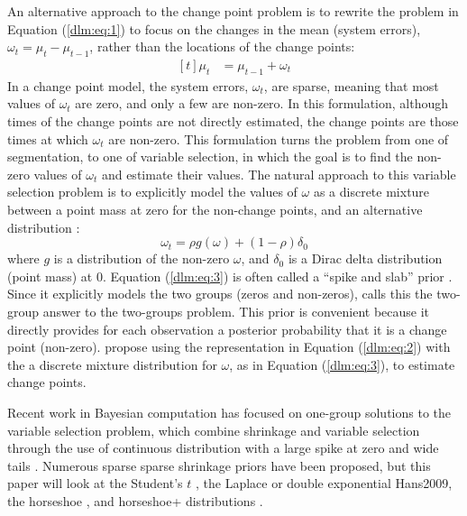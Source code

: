 An alternative approach to the change point problem is to rewrite the problem in Equation (\ref{dlm:eq:1}) to focus on the changes in the mean (system errors), $\omega_{t} = \mu_{t} - \mu_{t - 1}$, rather than the locations of the change points:
\begin{equation}
  \label{dlm:eq:2}
  \begin{aligned}[t]
    \mu_{t} &= \mu_{t - 1} + \omega_{t}
  \end{aligned}
\end{equation}
In a change point model, the system errors, $\omega_{t}$, are sparse, meaning that most values of $\omega_{t}$ are zero, and only a few are non-zero.
In this formulation, although times of the change points are not directly estimated, the change points are those times at which $\omega_{t}$ are non-zero.
This formulation turns the problem from one of segmentation, to one of variable selection, in which the goal is to find the non-zero values of $\omega_{t}$ and estimate their values.%
The natural approach to this variable selection problem is to explicitly model the values of $\omega$ as a discrete mixture between a point mass at zero for the non-change points, and an alternative distribution \parencites{MitchellBeauchamp1988a}{Efron2008a}:
\begin{equation}
  \label{dlm:eq:3}
  \omega_{t} = \rho g(\omega) + (1 - \rho) \delta_{0}
\end{equation}
where $g$ is a distribution of the non-zero $\omega$, and $\delta_{0}$ is a Dirac delta distribution (point mass) at 0.
Equation (\ref{dlm:eq:3}) is often called a ``spike and slab'' prior \parencite{MitchellBeauchamp1988a}.
Since it explicitly models the two groups (zeros and non-zeros), \textcite{Efron2008a} calls this the two-group answer to the two-groups problem.
This prior is convenient because it directly provides for each observation a posterior probability that it is a change point (non-zero).
\textcite{GiordaniKohn2008} propose using the representation in Equation (\ref{dlm:eq:2}) with the a discrete mixture distribution for $\omega$, as in Equation (\ref{dlm:eq:3}), to estimate change points.

Recent work in Bayesian computation has focused on one-group solutions to the variable selection problem, which combine shrinkage and variable selection through the use of continuous distribution with a large spike at zero and wide tails \parencite{PolsonScott2010}.
Numerous sparse sparse shrinkage priors have been proposed, but this paper will look at the Student's $t$  \parencite{Tipping2001}, the Laplace or double exponential \parencite{ParkCasella2008}{Hans2009}, the horseshoe \parencite{CarvalhoPolsonScott2010}, and horseshoe+ distributions \parencite{BhadraDattaPolsonEtAl2015a}.

